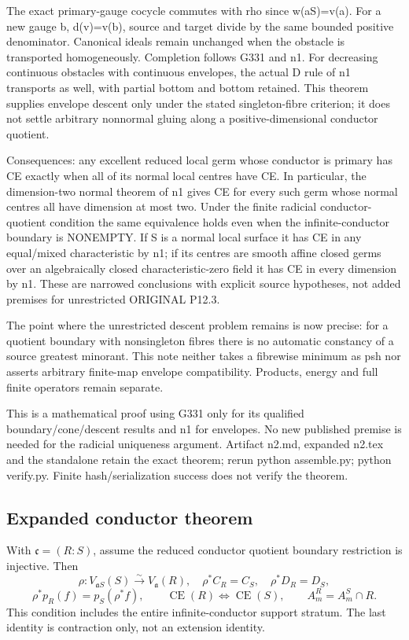 \documentclass[11pt]{article}
\begin{document}
The exact primary-gauge cocycle commutes with rho since w(aS)=v(a). For a new gauge b, d(v)=v(b), source and target divide by the same bounded positive denominator. Canonical ideals remain unchanged when the obstacle is transported homogeneously. Completion follows G331 and n1. For decreasing continuous obstacles with continuous envelopes, the actual D rule of n1 transports as well, with partial bottom and bottom retained. This theorem supplies envelope descent only under the stated singleton-fibre criterion; it does not settle arbitrary nonnormal gluing along a positive-dimensional conductor quotient.

Consequences: any excellent reduced local germ whose conductor is primary has CE exactly when all of its normal local centres have CE. In particular, the dimension-two normal theorem of n1 gives CE for every such germ whose normal centres all have dimension at most two. Under the finite radicial conductor-quotient condition the same equivalence holds even when the infinite-conductor boundary is NONEMPTY. If S is a normal local surface it has CE in any equal/mixed characteristic by n1; if its centres are smooth affine closed germs over an algebraically closed characteristic-zero field it has CE in every dimension by n1. These are narrowed conclusions with explicit source hypotheses, not added premises for unrestricted ORIGINAL P12.3.

The point where the unrestricted descent problem remains is now precise: for a quotient boundary with nonsingleton fibres there is no automatic constancy of a source greatest minorant. This note neither takes a fibrewise minimum as psh nor asserts arbitrary finite-map envelope compatibility. Products, energy and full finite operators remain separate.

This is a mathematical proof using G331 only for its qualified boundary/cone/descent results and n1 for envelopes. No new published premise is needed for the radicial uniqueness argument. Artifact n2.md, expanded n2.tex and the standalone retain the exact theorem; rerun python assemble.py; python verify.py. Finite hash/serialization success does not verify the theorem.

\subsection*{Expanded conductor theorem}
With $\mathfrak c=(R:S)$, assume the reduced conductor quotient boundary
restriction is injective. Then
\[
\rho:V_{\mathfrak aS}(S)\xrightarrow{\sim}V_{\mathfrak a}(R),\quad
\rho^*C_R=C_S,\quad\rho^*D_R=D_S,
\]
\[
\rho^*p_R(f)=p_S(\rho^*f),\qquad
\operatorname{CE}(R)\Longleftrightarrow\operatorname{CE}(S),\qquad
A_m^R=A_m^S\cap R.
\]
This condition includes the entire infinite-conductor support stratum.
The last identity is contraction only, not an extension identity.
\end{document}
